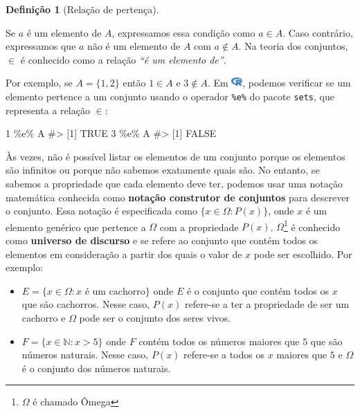 \documentclass[
  letterpaper,
]{book}
\newenvironment{Shaded}{\begin{snugshade}}{\end{snugshade}}
\newcommand{\CommentTok}[1]{\textcolor[rgb]{0.37,0.37,0.37}{#1}}
\newcommand{\DecValTok}[1]{\textcolor[rgb]{0.68,0.00,0.00}{#1}}
\newcommand{\NormalTok}[1]{\textcolor[rgb]{0.00,0.23,0.31}{#1}}
\newcommand{\SpecialCharTok}[1]{\textcolor[rgb]{0.37,0.37,0.37}{#1}}
\providecommand{\tightlist}{%
  \setlength{\itemsep}{0pt}\setlength{\parskip}{0pt}}\usepackage{longtable,booktabs,array}
\theoremstyle{definition}
\newtheorem{definition}{Definição}[chapter]
\theoremstyle{plain}
\theoremstyle{remark}
\begin{document}
\begin{definition}[Relação de
pertença]\protect\hypertarget{def-membership-relation}{}\label{def-membership-relation}

Se \(a\) é um elemento de \(A\), expressamos essa condição como
\(a \in A\). Caso contrário, expressamos que \(a\) não é um elemento de
\(A\) com \(a \notin A\). Na teoria dos conjuntos, \(\in\) é conhecido
como a relação \emph{``é um elemento de''}.

\end{definition}

Por exemplo, se \(A = \{ 1 , 2 \}\) então \(1 \in A\) e \(3 \notin A\).
Em
\includegraphics[width=1.13em,height=1em]{naive_set_theory_files/figure-pdf/fa-icon-9b00320707d42527dde67262afb33ded.pdf},
podemos verificar se um elemento pertence a um conjunto usando o
operador \texttt{\%e\%} do pacote \texttt{sets}, que representa a
relação \(\in\):

\begin{Shaded}
\begin{Highlighting}[]
\DecValTok{1} \SpecialCharTok{\%e\%}\NormalTok{ A}
\CommentTok{\#\textgreater{} [1] TRUE}
\DecValTok{3} \SpecialCharTok{\%e\%}\NormalTok{ A}
\CommentTok{\#\textgreater{} [1] FALSE}
\end{Highlighting}
\end{Shaded}

Às vezes, não é possível listar os elementos de um conjunto porque os
elementos são infinitos ou porque não sabemos exatamente quais são. No
entanto, se sabemos a propriedade que cada elemento deve ter, podemos
usar uma notação matemática conhecida como \textbf{notação construtor de
conjuntos} para descrever o conjunto. Essa notação é especificada como
\(\{ x \in \Omega: P(x) \}\), onde \(x\) é um elemento genérico que
pertence a \(\Omega\) com a propriedade \(P(x)\). \(\Omega\)\footnote{\(\Omega\)
  é chamado Ômega} é conhecido como \textbf{universo de discurso} e se
refere ao conjunto que contém todos os elementos em consideração a
partir dos quais o valor de \(x\) pode ser escolhido. Por exemplo:

\begin{itemize}
\tightlist
\item
  \(E = \{ x \in \Omega: x \text{ é um cachorro} \}\) onde \(E\) é o
  conjunto que contém todos os \(x\) que são cachorros. Nesse caso,
  \(P(x)\) refere-se a ter a propriedade de ser um cachorro e \(\Omega\)
  pode ser o conjunto dos seres vivos.
\item
  \(F = \{ x \in \mathbb{N} : x > 5 \}\) onde \(F\) contém todos os
  números maiores que \(5\) que são números naturais. Nesse caso,
  \(P(x)\) refere-se a todos os \(x\) maiores que \(5\) e \(\Omega\) é o
  conjunto dos números naturais.
\end{itemize}
\end{document}
